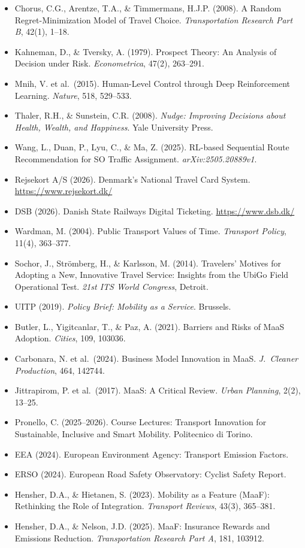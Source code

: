 \documentclass[11pt,a4paper]{article}
\begin{document}
\begin{itemize}[leftmargin=*, label={}, nosep]
    \item Chorus, C.G., Arentze, T.A., \& Timmermans, H.J.P. (2008). A Random Regret-Minimization Model of Travel Choice. \textit{Transportation Research Part B}, 42(1), 1--18.
    \item Kahneman, D., \& Tversky, A. (1979). Prospect Theory: An Analysis of Decision under Risk. \textit{Econometrica}, 47(2), 263--291.
    \item Mnih, V. et al.\ (2015). Human-Level Control through Deep Reinforcement Learning. \textit{Nature}, 518, 529--533.
    \item Thaler, R.H., \& Sunstein, C.R. (2008). \textit{Nudge: Improving Decisions about Health, Wealth, and Happiness}. Yale University Press.
    \item Wang, L., Duan, P., Lyu, C., \& Ma, Z. (2025). RL-based Sequential Route Recommendation for SO Traffic Assignment. \textit{arXiv:2505.20889v1}.
    \item Rejsekort A/S (2026). Denmark's National Travel Card System. \url{https://www.rejsekort.dk/}
    \item DSB (2026). Danish State Railways Digital Ticketing. \url{https://www.dsb.dk/}
    \item Wardman, M. (2004). Public Transport Values of Time. \textit{Transport Policy}, 11(4), 363--377.
    \item Sochor, J., Str\"omberg, H., \& Karlsson, M. (2014). Travelers' Motives for Adopting a New, Innovative Travel Service: Insights from the UbiGo Field Operational Test. \textit{21st ITS World Congress}, Detroit.
    \item UITP (2019). \textit{Policy Brief: Mobility as a Service}. Brussels.
    \item Butler, L., Yigitcanlar, T., \& Paz, A. (2021). Barriers and Risks of MaaS Adoption. \textit{Cities}, 109, 103036.
    \item Carbonara, N. et al.\ (2024). Business Model Innovation in MaaS. \textit{J.\ Cleaner Production}, 464, 142744.
    \item Jittrapirom, P. et al.\ (2017). MaaS: A Critical Review. \textit{Urban Planning}, 2(2), 13--25.
    \item Pronello, C. (2025--2026). Course Lectures: Transport Innovation for Sustainable, Inclusive and Smart Mobility. Politecnico di Torino.
    \item EEA (2024). European Environment Agency: Transport Emission Factors.
    \item ERSO (2024). European Road Safety Observatory: Cyclist Safety Report.
    \item Hensher, D.A., \& Hietanen, S. (2023). Mobility as a Feature (MaaF): Rethinking the Role of Integration. \textit{Transport Reviews}, 43(3), 365--381.
    \item Hensher, D.A., \& Nelson, J.D. (2025). MaaF: Insurance Rewards and Emissions Reduction. \textit{Transportation Research Part A}, 181, 103912.
\end{itemize}
\end{document}
